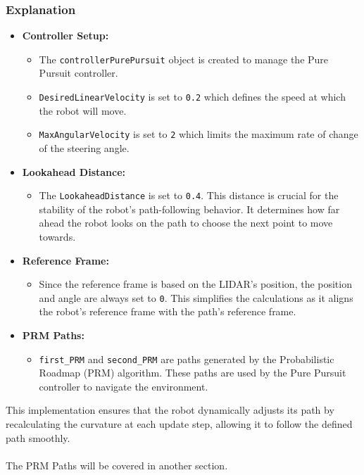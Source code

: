 \documentclass{article}
\begin{document}
	\subsubsection*{Explanation}
	\begin{itemize}
		\item \textbf{Controller Setup:}
		\begin{itemize}
			\item The \texttt{controllerPurePursuit} object is created to manage the Pure Pursuit controller.
			\item \texttt{DesiredLinearVelocity} is set to \texttt{0.2} which defines the speed at which the robot will move.
			\item \texttt{MaxAngularVelocity} is set to \texttt{2} which limits the maximum rate of change of the steering angle.
		\end{itemize}
		\item \textbf{Lookahead Distance:}
		\begin{itemize}
			\item The \texttt{LookaheadDistance} is set to \texttt{0.4}. This distance is crucial for the stability of the robot's path-following behavior. It determines how far ahead the robot looks on the path to choose the next point to move towards.
		\end{itemize}
		\item \textbf{Reference Frame:}
		\begin{itemize}
			\item Since the reference frame is based on the LIDAR's position, the position and angle are always set to \texttt{0}. This simplifies the calculations as it aligns the robot's reference frame with the path's reference frame.
		\end{itemize}
		\item \textbf{PRM Paths:}
		\begin{itemize}
			\item \texttt{first\_PRM} and \texttt{second\_PRM} are paths generated by the Probabilistic Roadmap (PRM) algorithm. These paths are used by the Pure Pursuit controller to navigate the environment.
		\end{itemize}
	\end{itemize}
	This implementation ensures that the robot dynamically adjusts its path by recalculating the curvature at each update step, allowing it to follow the defined path smoothly.
	\\\\
	\noindent The PRM Paths will be covered in another section.
	
\end{document}
